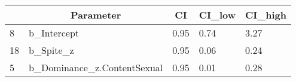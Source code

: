 \documentclass[
  english,
  a4paper,floatsintext]{apa7}
\begin{document}
\endgroup

\newpage

\begin{table}[tbp]

\begin{center}
\begin{threeparttable}

\caption{\label{tab:unnamed-chunk-2}}

\begin{tabular}{lllll}
\toprule
 & \multicolumn{1}{c}{Parameter} & \multicolumn{1}{c}{CI} & \multicolumn{1}{c}{CI\_low} & \multicolumn{1}{c}{CI\_high}\\
\midrule
8 & b\_Intercept & 0.95 & 0.74 & 3.27\\
18 & b\_Spite\_z & 0.95 & 0.06 & 0.24\\
5 & b\_Dominance\_z.ContentSexual & 0.95 & 0.01 & 0.28\\
\bottomrule
\end{tabular}

\end{threeparttable}
\end{center}

\end{table}
\end{document}
